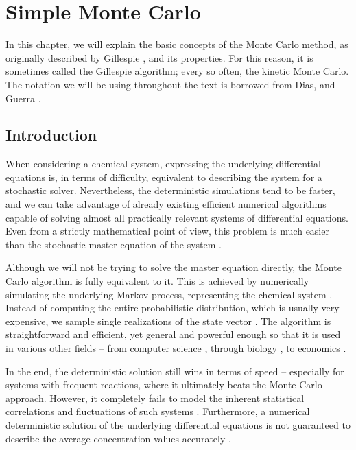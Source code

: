 \chapter{Simple Monte Carlo}

In this chapter, we will explain the basic concepts of the Monte Carlo method, as originally described by Gillespie \cite{gillespie76}, and its properties. For this reason, it is sometimes called the Gillespie algorithm; every so often, the kinetic Monte Carlo. The notation we will be using throughout the text is borrowed from Dias, and Guerra \cite{tiago20}.

\section{Introduction}

When considering a chemical system, expressing the underlying differential equations is, in terms of difficulty, equivalent to describing the system for a stochastic solver. Nevertheless, the deterministic simulations tend to be faster, and we can take advantage of already existing efficient numerical algorithms capable of solving almost all practically relevant systems of differential equations. Even from a strictly mathematical point of view, this problem is much easier than the stochastic master equation of the system \cite{gillespie76}.

Although we will not be trying to solve the master equation directly, the Monte Carlo algorithm is fully equivalent to it. This is achieved by numerically simulating the underlying Markov process, representing the chemical system \cite{gillespie76}. Instead of computing the entire probabilistic distribution, which is usually very expensive, we sample single realizations of the state vector \cite{mc_matlab}. The algorithm is straightforward and efficient, yet general and powerful enough so that it is used in various other fields -- from computer science \cite{computer_science}, through biology \cite{biology}, to economics \cite{economics}.

In the end, the deterministic solution still wins in terms of speed -- especially for systems with frequent reactions, where it ultimately beats the Monte Carlo approach. However, it completely fails to model the inherent statistical correlations and fluctuations of such systems \cite{gillespie76}. Furthermore, a numerical deterministic solution of the underlying differential equations is not guaranteed to describe the average concentration values accurately \cite{gillespie77}.


